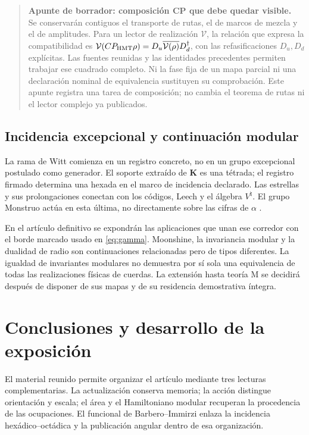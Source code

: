 \documentclass[11pt,a4paper]{article}
\numberwithin{equation}{section}
\theoremstyle{definition}
\newenvironment{apunte}[1]{\par\Needspace{6\baselineskip}\smallskip
\begin{quote}\small\raggedright\color{ink}\noindent\textbf{Apunte de borrador: #1.}\ }
{\end{quote}\smallskip}
\begin{document}
\begin{apunte}{composición CP que debe quedar visible}
Se conservarán contiguos el transporte de rutas, el de marcos de
mezcla y el de amplitudes. Para un lector de realización $\mathcal V$,
la relación que expresa la compatibilidad es
$\mathcal V(CP_{\rm HMT}\rho)
=D_u\overline{\mathcal V(\rho)}D_d^\dagger$,
con las refasificaciones $D_u,D_d$ explícitas.
Las fuentes reunidas y las identidades precedentes permiten trabajar
ese cuadrado completo. Ni la fase fija de un mapa parcial ni una
declaración nominal de equivalencia sustituyen su comprobación.
Este apunte registra una tarea de composición; no cambia el teorema
de rutas ni el lector complejo ya publicados.
\end{apunte}

\subsection{Incidencia excepcional y continuación modular}

La rama de Witt comienza en un registro concreto, no en un grupo
excepcional postulado como generador. El soporte extraído de
$\mathbf K$ es una tétrada; el registro firmado determina una
hexada en el marco de incidencia declarado. Las estrellas y sus
prolongaciones conectan con los códigos, Leech y el álgebra
$V^\natural$. El grupo Monstruo actúa en esta última, no directamente
sobre las cifras de $\alpha$ \cite{witt}.

En el artículo definitivo se expondrán las aplicaciones que unan ese
corredor con el borde marcado usado en \eqref{eq:gamma}.
Moonshine, la invariancia modular y la dualidad de radio son
continuaciones relacionadas pero de tipos diferentes.
La igualdad de invariantes modulares no demuestra por sí sola una
equivalencia de todas las realizaciones físicas de cuerdas.
La extensión hasta teoría M se decidirá después de disponer de sus
mapas y de su residencia demostrativa íntegra.

\clearpage
\section{Conclusiones y desarrollo de la exposición}
El material reunido permite organizar el artículo mediante tres
lecturas complementarias. La actualización conserva memoria;
la acción distingue orientación y escala; el área y el Hamiltoniano
modular recuperan la procedencia de las ocupaciones.
El funcional de Barbero--Immirzi enlaza la incidencia
hexádico--octádica y la publicación angular dentro de esa organización.
\end{document}
